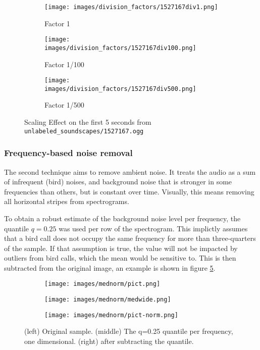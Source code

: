 \begin{figure}[htbp]
    \centering
    \begin{subfigure}[b]{0.3\textwidth}
        \centering
        \texttt{[image: images/division\_factors/1527167div1.png]}
        \caption{Factor 1}
        \label{fig:division_factor=1}
    \end{subfigure}
    \hfill
    \begin{subfigure}[b]{0.3\textwidth}
        \centering
        \texttt{[image: images/division\_factors/1527167div100.png]}
        \caption{Factor 1/100}
        \label{fig:division_factor=100}
    \end{subfigure}
    \hfill
    \begin{subfigure}[b]{0.3\textwidth}
        \centering
        \texttt{[image: images/division\_factors/1527167div500.png]}
        \caption{Factor 1/500}
        \label{fig:division_factor=500}
    \end{subfigure}
    \caption{Scaling Effect on the first 5 seconds from \texttt{unlabeled\_soundscapes/1527167.ogg}}
    \label{fig:division_factor}
\end{figure}


\subsubsection{Frequency-based noise removal}
The second technique aims to remove ambient noise. It treats the audio as a sum of infrequent (bird) noises, and background noise that is stronger in some frequencies than others, but is constant over time. Visually, this means removing all horizontal stripes from spectrograms.

To obtain a robust estimate of the background noise level per frequency, the quantile $q=0.25$ was used per row of the spectrogram. This implictly assumes that a bird call does not occupy the same frequency for more than three-quarters of the sample. If that assumption is true, the value will not be impacted by outliers from bird calls, which the mean would be sensitive to. This is then subtracted from the original image, an example is shown in figure \ref{fig:mednorm}.

\begin{figure}[htbp]
    \centering
    \begin{subfigure}[b]{0.3\textwidth}
        \centering
        \texttt{[image: images/mednorm/pict.png]}
    \end{subfigure}
    \begin{subfigure}[b]{0.1\textwidth}
        \centering
        \texttt{[image: images/mednorm/medwide.png]}
    \end{subfigure}
    \begin{subfigure}[b]{0.3\textwidth}
        \centering
        \texttt{[image: images/mednorm/pict-norm.png]}
    \end{subfigure}
    \caption{(left) Original sample. (middle) The q=0.25 quantile per frequency, one dimensional. (right) after subtracting the quantile.}
    \label{fig:mednorm}
\end{figure}

